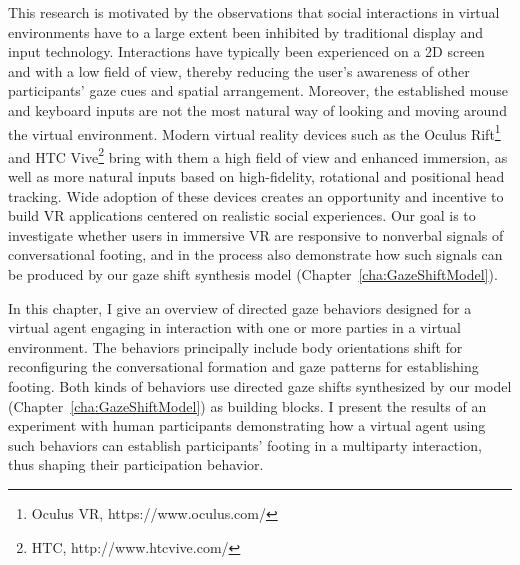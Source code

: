 This research is motivated by the observations that social interactions in virtual environments have to a large extent been inhibited by traditional display and input technology. Interactions have typically been experienced on a 2D screen and with a low field of view, thereby reducing the user's awareness of other participants' gaze cues and spatial arrangement. Moreover, the established mouse and keyboard inputs are not the most natural way of looking and moving around the virtual environment. Modern virtual reality devices such as the Oculus Rift\footnote{Oculus VR, https://www.oculus.com/} and HTC Vive\footnote{HTC, http://www.htcvive.com/} bring with them a high field of view and enhanced immersion, as well as more natural inputs based on high-fidelity, rotational and positional head tracking. Wide adoption of these devices creates an opportunity and incentive to build VR applications centered on realistic social experiences. Our goal is to investigate whether users in immersive VR are responsive to nonverbal signals of conversational footing, and in the process also demonstrate how such signals can be produced by our gaze shift synthesis model (Chapter~\ref{cha:GazeShiftModel}).

In this chapter, I give an overview of directed gaze behaviors designed for a virtual agent engaging in interaction with one or more parties in a virtual environment. The behaviors principally include body orientations shift for reconfiguring the conversational formation and gaze patterns for establishing footing. Both kinds of behaviors use directed gaze shifts synthesized by our model (Chapter~\ref{cha:GazeShiftModel}) as building blocks. I present the results of an experiment with human participants demonstrating how a virtual agent using such behaviors can establish participants' footing in a multiparty interaction, thus shaping their participation behavior.
